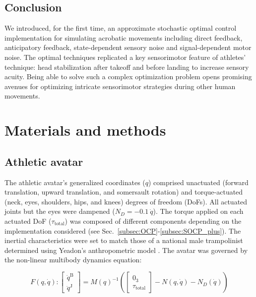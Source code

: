 \documentclass[10pt,letterpaper]{article}
\begin{document}
\subsection{Conclusion}
We introduced, for the first time, an approximate stochastic optimal control implementation for simulating acrobatic movements including direct feedback, anticipatory feedback, state-dependent sensory noise and signal-dependent motor noise.
The optimal techniques replicated a key sensorimotor feature of athletes' technique: head stabilization after takeoff and before landing to increase sensory acuity. 
Being able to solve such a complex optimization problem opens promising avenues for optimizing intricate sensorimotor strategies during other human movements.



\section{Materials and methods}\label{sec:methods}

\subsection{Athletic avatar}
The athletic avatar's generalized coordinates ($q$) comprised unactuated (forward translation, upward translation, and somersault rotation) and torque-actuated (neck, eyes, shoulders, hips, and knees) degrees of freedom (DoFs).
All actuated joints but the eyes were dampened ($N_D =- 0.1~\dot{q}$).
The torque applied on each actuated DoF ($\tau_{\text{total}}$) was composed of different components depending on the implementation considered (see Sec.~\ref{subsec:OCP}-\ref{subsec:SOCP_plus}).
The  inertial characteristics were set to match those of a national male trampolinist determined using Yeadon's anthropometric model \cite{yeadon1990simulation2}.
The avatar was governed by the non-linear multibody dynamics equation:

\begin{equation}
F(q, \dot{q}) : 
	\begin{bmatrix}
	\ddot{q}^{\text{B}}  \\
	\ddot{q}^{\text{J}}
	\end{bmatrix}
	= M(q)^{-1} \left(
	{\begin{bmatrix}
	0_3 \\
	\tau_{\text{total}}
	\end{bmatrix}
	- N(q, \dot{q}) - N_D(\dot{q})} \right) \label{eq:dynamics}
\end{equation}
\end{document}
